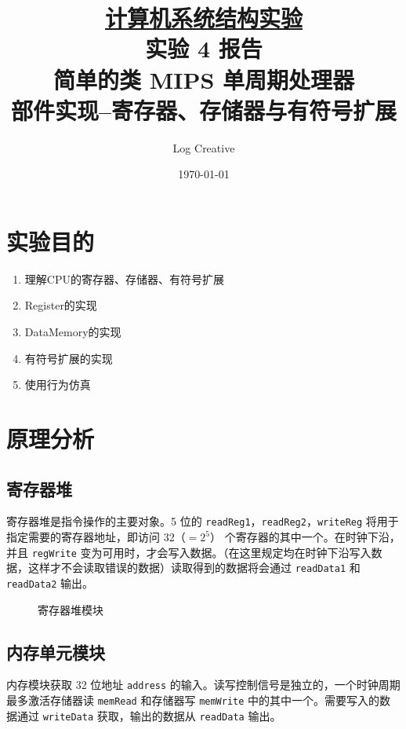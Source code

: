 \documentclass[a4paper,UTF8]{ctexart}
\begin{document}
\title{\normalsize \underline{计算机系统结构实验}\\\LARGE 实验 4 报告\\\vspace*{1em}\normalsize 简单的类 MIPS 单周期处理器\\部件实现--寄存器、存储器与有符号扩展}
\author{Log Creative}
\date{\today}
\maketitle
\tableofcontents
\clearpage

\section{实验目的}

\begin{enumerate}
    \item 理解CPU的寄存器、存储器、有符号扩展
    \item Register的实现
    \item DataMemory的实现
    \item 有符号扩展的实现
    \item 使用行为仿真
\end{enumerate}

\section{原理分析}

\subsection{寄存器堆}

寄存器堆是指令操作的主要对象。5 位的 \verb"readReg1"，\verb"readReg2"，\verb"writeReg" 将用于指定需要的寄存器地址，即访问 32（$=2^5$） 个寄存器的其中一个。在时钟下沿，并且 \verb"regWrite" 变为可用时，才会写入数据。（在这里规定均在时钟下沿写入数据，这样才不会读取错误的数据）读取得到的数据将会通过 \verb"readData1" 和 \verb"readData2" 输出。

\begin{figure}[h]
    \centering
    
    \caption{寄存器堆模块}
\end{figure}

\subsection{内存单元模块}

内存模块获取 32 位地址 \verb"address" 的输入。读写控制信号是独立的，一个时钟周期最多激活存储器读 \verb"memRead" 和存储器写 \verb"memWrite" 中的其中一个。需要写入的数据通过 \verb"writeData" 获取，输出的数据从 \verb"readData" 输出。
\end{document}
